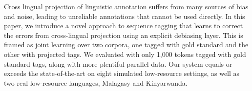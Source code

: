 Cross lingual projection of linguistic annotation suffers from many sources of bias and noise, leading to unreliable annotations that cannot be used directly. In this paper, we introduce a novel approach to sequence tagging that learns to correct the errors from cross-lingual projection using an explicit debiasing layer. This is framed as joint learning over two corpora, one tagged with gold standard and the other with projected tags. We evaluated with only 1,000 tokens tagged with gold standard tags, along with more plentiful parallel data. Our system equals or exceeds the state-of-the-art on eight simulated low-resource settings, as well as two real low-resource languages, Malagasy and Kinyarwanda.
